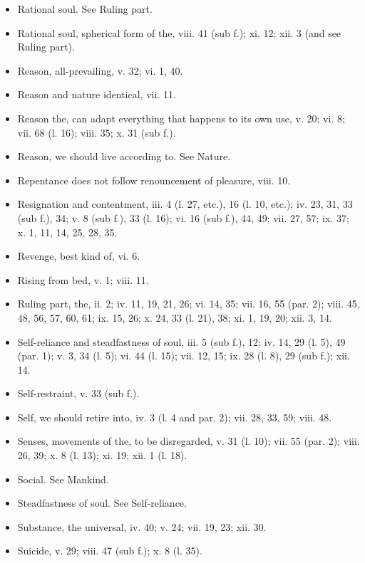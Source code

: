\begin{itemize}[leftmargin=*]
\setlength\itemsep{0em}
\item
  Rational soul. See Ruling part.
\item
  Rational soul, spherical form of the, viii. 41 (sub f.); xi. 12; xii.
  3 (and see Ruling part).
\item
  Reason, all-prevailing, v. 32; vi. 1, 40.
\item
  Reason and nature identical, vii. 11.
\item
  Reason the, can adapt everything that happens to its own use, v. 20;
  vi. 8; vii. 68 (l. 16); viii. 35; x. 31 (sub f.).
\item
  Reason, we should live according to. See Nature.
\item
  Repentance does not follow renouncement of pleasure, viii. 10.
\item
  Resignation and contentment, iii. 4 (l. 27, etc.), 16 (l. 10, etc.);
  iv. 23, 31, 33 (sub f.), 34; v. 8 (sub f.), 33 (l. 16); vi. 16 (sub
  f.), 44, 49; vii. 27, 57; ix. 37; x. 1, 11, 14, 25, 28, 35.
\item
  Revenge, best kind of, vi. 6.
\item
  Rising from bed, v. 1; viii. 11.
\item
  Ruling part, the, ii. 2; iv. 11, 19, 21, 26; vi. 14, 35; vii. 16, 55
  (par. 2); viii. 45, 48, 56, 57, 60, 61; ix. 15, 26; x. 24, 33 (l. 21),
  38; xi. 1, 19, 20; xii. 3, 14.
\end{itemize}

\begin{itemize}[leftmargin=*]
\setlength\itemsep{0em}
\item
  Self-reliance and steadfastness of soul, iii. 5 (sub f.), 12; iv. 14,
  29 (l. 5), 49 (par. 1); v. 3, 34 (l. 5); vi. 44 (l. 15); vii. 12, 15;
  ix. 28 (l. 8), 29 (sub f.); xii. 14.
\item
  Self-restraint, v. 33 (sub f.).
\item
  Self, we should retire into, iv. 3 (l. 4 and par. 2); vii. 28, 33, 59;
  viii. 48.
\item
  Senses, movements of the, to be disregarded, v. 31 (l. 10); vii. 55
  (par. 2); viii. 26, 39; x. 8 (l. 13); xi. 19; xii. 1 (l. 18).
\item
  Social. See Mankind.
\item
  Steadfastness of soul. See Self-reliance.
\item
  Substance, the universal, iv. 40; v. 24; vii. 19, 23; xii. 30.
\item
  Suicide, v. 29; viii. 47 (sub f.); x. 8 (l. 35).
\end{itemize}

